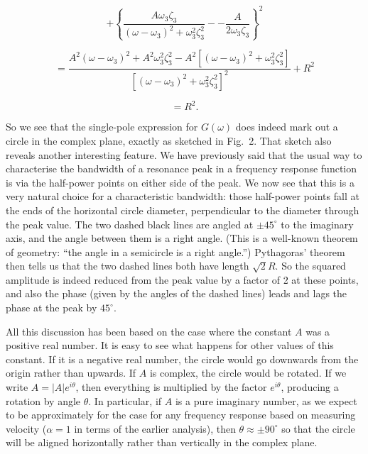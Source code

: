   \begin{equation*}+ \left\lbrace \dfrac{A\omega_3\zeta_3}{(\omega-\omega_3)^2 
  + \omega_3^2 \zeta_3^2} -- \dfrac{A}{2 \omega_3 \zeta_3} \right\rbrace^2 
  \end{equation*} 

  \begin{equation*}=\dfrac{A^2(\omega-\omega_3)^2 + A^2 \omega_3^2 
  \zeta_3^2-A^2 [(\omega-\omega_3)^2 + \omega_3^2 
  \zeta_3^2]}{[(\omega-\omega_3)^2 + \omega_3^2 
  \zeta_3^2]^2}+R^2\end{equation*} 

  \begin{equation*}=R^2. \tag{26}\end{equation*} 

  So we see that the single-pole expression for $G(\omega)$ does indeed mark 
  out a circle in the complex plane, exactly as sketched in Fig.\ 2. That 
  sketch also reveals another interesting feature. We have previously said that 
  the usual way to characterise the bandwidth of a resonance peak in a 
  frequency response function is via the half-power points on either side of 
  the peak. We now see that this is a very natural choice for a characteristic 
  bandwidth: those half-power points fall at the ends of the horizontal circle 
  diameter, perpendicular to the diameter through the peak value. The two 
  dashed black lines are angled at $\pm45^\circ$ to the imaginary axis, and the 
  angle between them is a right angle. (This is a well-known theorem of 
  geometry: ``the angle in a semicircle is a right angle.'') Pythagoras' 
  theorem then tells us that the two dashed lines both have length $\sqrt{2}R$. 
  So the squared amplitude is indeed reduced from the peak value by a factor of 
  2 at these points, and also the phase (given by the angles of the dashed 
  lines) leads and lags the phase at the peak by $45^\circ$. 

  All this discussion has been based on the case where the constant $A$ was a 
  positive real number. It is easy to see what happens for other values of this 
  constant. If it is a negative real number, the circle would go downwards from 
  the origin rather than upwards. If $A$ is complex, the circle would be 
  rotated. If we write $A=|A| e^{i \theta}$, then everything is multiplied by 
  the factor $e^{i \theta}$, producing a rotation by angle $\theta$. In 
  particular, if $A$ is a pure imaginary number, as we expect to be 
  approximately for the case for any frequency response based on measuring 
  velocity ($\alpha = 1$ in terms of the earlier analysis), then $\theta 
  \approx \pm 90^\circ$ so that the circle will be aligned horizontally rather 
  than vertically in the complex plane. 

